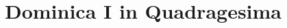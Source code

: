 \documentclass[17pt]{extarticle}
\begin{document}
\title{Dominica I in Quadragesima}
\makereadingtitle

\end{document}
